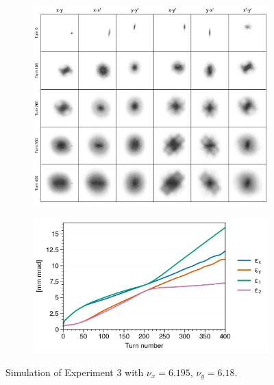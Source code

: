 %
\begin{figure}[!p]
    \centering
    \begin{subfigure}{\textwidth}
        \includegraphics[width=\textwidth]{Images/chapter5/exp3/sim_snapshots_nux6.195_nuy6.18.png}
    \end{subfigure}
    \vfill
    \vspace*{1.0cm}
    \vfill
    \begin{subfigure}{0.7\textwidth}
        \includegraphics[width=\textwidth]{Images/chapter5/exp3/sim_emittances_nux6.195_nuy6.18.png}
    \end{subfigure}
    \caption{Simulation of Experiment 3 with $\nu_x = 6.195$, $\nu_y = 6.18$.}
    \label{fig:exp3_sim_nux6.195_nuy6.18}
\end{figure}
%
